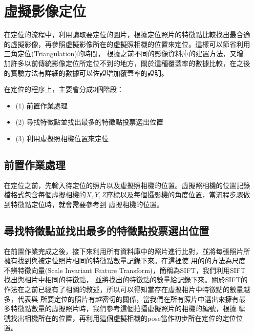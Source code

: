 \section{虛擬影像定位}

%
	在定位的流程中，利用讀取要定位的圖片，根據定位照片的特徵點比較找出最合適的虛擬影像，再參照虛擬影像所在的虛擬照相機的位置來定位。這樣可以節省利用三角定位(Triangulation)的時間，
	根據之前不同的影像資料庫的建置方法，又增加許多以前傳統影像定位所定位不到的地方，關於這種覆蓋率的數據比較，在之後的實驗方法有詳細的數據可以佐證增加覆蓋率的證明。
	
	在定位的程序上，主要會分成3個階段：
		\begin{itemize}
			\item (1) 前置作業處理
    		\item (2) 尋找特徵點並找出最多的特徵點投票選出位置
    		\item (3) 利用虛擬照相機位置來定位
		\end{itemize} 
	
	
\subsection{前置作業處理}	

	在定位之前，先輸入待定位的照片以及虛擬照相機的位置。虛擬照相機的位置記錄檔格式包含每個虛擬相機的$X,Y,Z$座標以及每個攝影機的角度位置，當流程步驟做到特徵點定位時，就會需要參考到
	虛擬相機的位置。
		
\subsection{尋找特徵點並找出最多的特徵點投票選出位置}	

	在前置作業完成之後，接下來利用所有資料庫中的照片進行比對，並將每張照片所擁有找到與被定位照片相同的特徵點數量記錄下來。在這裡使
	用的的方法為尺度不辨特徵向量(Scale Invariant Feature Transform)，簡稱為SIFT，我們利用SIFT找出與相片中相同的特徵點，
	並將找出的特徵點的數量給記錄下來。關於SIFT的作法在之前已經有了相關的敘述，所以可以得知當存在虛擬相片中特徵點的數量越多，代表與
	所要定位的照片有越密切的關係，當我們在所有照片中選出來擁有最多特徵點數量的虛擬照片時，我們參考這個拍攝虛擬照片的相機的編號，根據
	編號找出相機所在的位置，再利用這個虛擬相機的pose當作初步所在定位的定位位置。
	
